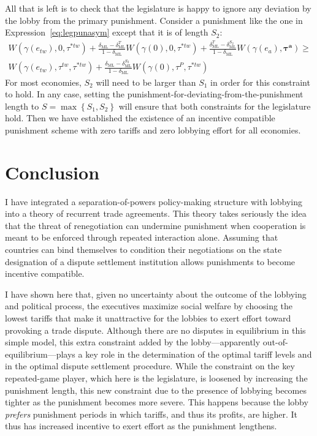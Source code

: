 \documentclass[authoryear, review]{elsarticle}
\newcommand{\bta}{\bm{\tau^a}}
\newcommand{\ga}{\gamma}
\newcommand{\de}{\delta}
\begin{document}
All that is left is to check that the legislature is happy to ignore any deviation by the lobby from the primary punishment. Consider a punishment like the one in Expression~\ref{eq:legpunasym} except that it is of length $S_2$:
\begin{multline}
		W(\ga(e_{tw}),0,\tau^{*tw}) + \frac{\de_\text{ML} - \de_\text{ML}^{T}}{1-\de_\text{ML}}W(\ga(0),0,\tau^{*tw}) + \frac{\de^{T}_\text{ML} - \de_\text{ML}^{S_2}}{1-\de_\text{ML}}W(\ga(e_a),\bta) \geq \\ W(\ga(e_{tw}),\tau^{tw},\tau^{*tw}) + \frac{\de_\text{ML} - \de_\text{ML}^{S_2}}{1-\de_\text{ML}}W(\ga(0),\tau^P,\tau^{*tw})
\end{multline}
For most economies, $S_2$ will need to be larger than $S_1$ in order for this constraint to hold. In any case, setting the punishment-for-deviating-from-the-punishment length to $S=\max\left\{S_1,S_2\right\}$ will ensure that both constraints for the legislature hold. Then we have established the existence of an incentive compatible punishment scheme with zero tariffs and zero lobbying effort for all economies.

	



\section{Conclusion}
\label{sec:concl3}
I have integrated a separation-of-powers policy-making structure with lobbying into a theory of recurrent trade agreements. This theory takes seriously the idea that the threat of renegotiation can undermine punishment when cooperation is meant to be enforced through repeated interaction alone. Assuming that countries can bind themselves to condition their negotiations on the state designation of a dispute settlement institution allows punishments to become incentive compatible.

I have shown here that, given no uncertainty about the outcome of the lobbying and political process, the executives maximize social welfare by choosing the lowest tariffs that make it unattractive for the lobbies to exert effort toward provoking a trade dispute. Although there are no disputes in equilibrium in this simple model, this extra constraint added by the lobby---apparently out-of-equilibrium---plays a key role in the determination of the optimal tariff levels and in the optimal dispute settlement procedure. While the constraint on the key repeated-game player, which here is the legislature, is loosened by increasing the punishment length, this new constraint due to the presence of lobbying becomes tighter as the punishment becomes more severe. This happens because the lobby \textit{prefers} punishment periods in which tariffs, and thus its profits, are higher. It thus has increased incentive to exert effort as the punishment lengthens.
\end{document}
